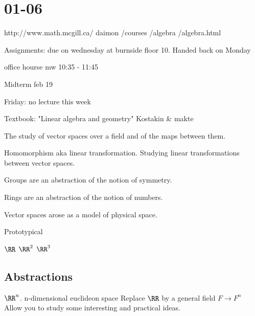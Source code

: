 \documentclass[class=scrartcl, crop=false]{standalone}
\date{2020-01-06}
\begin{document}
\section{01-06}

http://www.math.mcgill.ca/ daimon /courses /algebra /algebra.html

Assignments: due on wednesday at burnside floor 10. Handed back on Monday

office hourse mw 10:35 - 11:45

Midterm feb 19

Friday: no lecture this week

Textbook: "Linear algebra and geometry" Kostakin & makte

\begin{definition}
  The study of vector spaces over a field and of the maps between them.

  Homomorphism aka linear transformation. Studying linear transformations between vector spaces.
\end{definition} 

Groups are an abstraction of the notion of symmetry.

Rings are an abstraction of the notion of numbers.

Vector spaces arose as a model of physical space.

\begin{example}
  Prototypical
  \begin{enumerate}
    \ii
    $\RR$
    \ii
    $\RR^2$ 
    \ii
    $\RR^3$
  \end{enumerate} 
\end{example} 

\subsection{Abstractions}

\begin{enumerate}
  \ii
  $\RR^n$. n-dimensional euclideon space
  \ii
  Replace $\RR$ by a general field $F \to F^n$ 
  \\
  Allow you to study some interesting and practical ideas.
\end{enumerate} 
\end{document}
